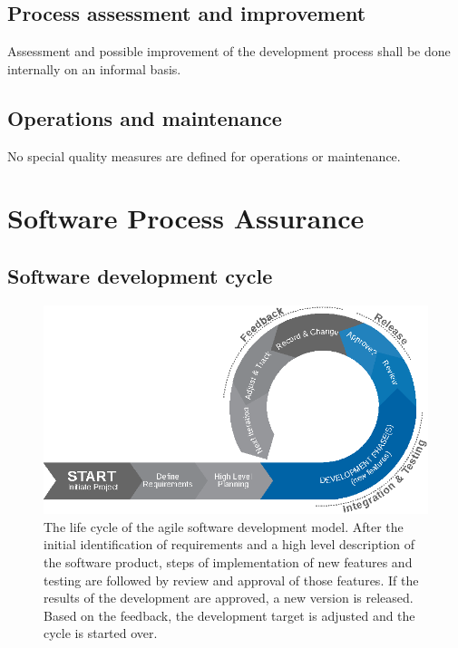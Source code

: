 \section{Process assessment and improvement}

Assessment and possible improvement of the development process shall be done 
internally on an informal basis.


\section{Operations and maintenance}

No special quality measures are defined for operations or maintenance.



\chapter{Software Process Assurance}


\section{Software development cycle}


\begin{figure}[htb]
\begin{center}
	\includegraphics[width=\columnwidth]{images/agile_sw_dev}
	\caption{The life cycle of the agile software development model.
		 After the initial identification of requirements and a high
		 level description of the software product, steps of
		 implementation of new features and testing are followed
		 by review and approval of those features. If the results
		 of the development are approved, a new version is released.
		 Based on the feedback, the development target is adjusted and
		 the cycle is started over.}
	\label{fig:agile_sw}
\end{center}
\end{figure}


